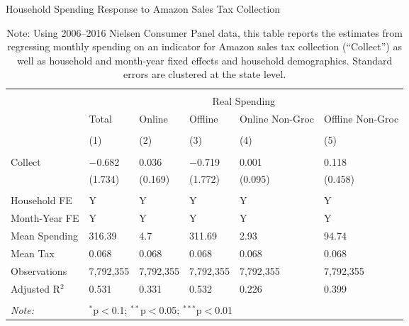 
\begin{table}[!htbp] \centering
  \caption{Household Spending Response to Amazon Sales Tax Collection}
  \label{tab:nielsenDiD}
\begin{tabularx}{\textwidth}{lXXXXX}
\\[-1.8ex]\hline
\hline \\[-1.8ex]
 & \multicolumn{5}{c}{Real Spending} \\
\cline{2-6}
 & Total & Online & Offline & Online Non-Groc & Offline Non-Groc \\
\\[-1.8ex] & (1) & (2) & (3) & (4) & (5)\\
\hline \\[-1.8ex]
 Collect & $-$0.682 & 0.036 & $-$0.719 & 0.001 & 0.118 \\
  & (1.734) & (0.169) & (1.772) & (0.095) & (0.458) \\
 \hline \\[-1.8ex]
Household FE & Y & Y & Y & Y & Y \\
Month-Year FE & Y & Y & Y & Y & Y \\
Mean Spending & 316.39 & 4.7 & 311.69 & 2.93 & 94.74 \\
Mean Tax & 0.068 & 0.068 & 0.068 & 0.068 & 0.068 \\
Observations & 7,792,355 & 7,792,355 & 7,792,355 & 7,792,355 & 7,792,355 \\
Adjusted R$^{2}$ & 0.531 & 0.331 & 0.532 & 0.226 & 0.399 \\
\hline
\hline \\[-1.8ex]
\textit{Note:}  & \multicolumn{5}{l}{$^{*}$p$<$0.1; $^{**}$p$<$0.05; $^{***}$p$<$0.01} \\
\end{tabularx}
\caption*{Note: Using 2006--2016 Nielsen Consumer Panel data, this table reports the estimates from regressing monthly spending on an indicator for Amazon sales tax collection (``Collect'') as well as household and month-year fixed effects and household demographics. Standard errors are clustered at the state level.}
\end{table}
